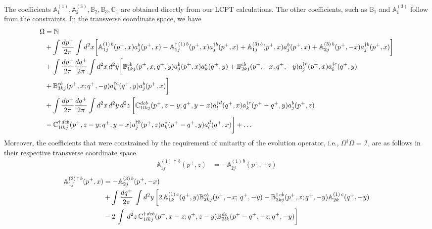 \documentclass[aps,prd,amsmath,amssymb,nofootinbib]{revtex4-2}
\def\mf#1{\mathbb{#1}}
\numberwithin{equation}{section}
\begin{document}
The coefficients $\mf{A}^{(1)}_{1}, \mf{A}^{(3)}_{2}, \mf{B}_{2}, \mf{B}_{3}, \mf{C}_{1}$ are obtained directly from our LCPT calculations. The other coefficients, such as $\mf{B}_{1}$ and $\mf{A}^{(3)}_{1}$ follow from the constraints. In the transverse coordinate space, we have
\begin{align}
    \Omega & = \mf{N} \notag \\ & +
                \int \frac{d p^+}{2\pi} 
             \int d^2 x  
                \bigg[\mf{A}^{(1)\, b}_{1j}(p^{+},x)a^{b}_{j}(p^{+},x) 
                -  \mf{A}^{\dagger\, (1)\, b}_{1j} (p^{+},x) a^{\dagger b}_{j}(p^{+},x)+ \mf{A}^{(3)\, b}_{1j}(p^{+},x)a^{b}_{j}(p^{+},x) 
                +  \mf{A}^{(3)\, b}_{2j} (p^{+},-x) a^{\dagger b}_{j}(p^{+},x)\bigg] \notag \\ & 
               +\int \frac{d p^+}{2\pi} \frac{d q^+}{2\pi} \int d^2x\, d^2y  
               \bigg[\mf{B}^{cb}_{1kj}(p^{+}, x;q^{+}, y) a^{b}_{j}(p^{+},x)a^{c}_{k}(q^{+},y) 
                   + \mf{B}^{cb}_{2kj}(p^{+},-x; q^{+},-y) a^{\dagger b}_{j}(p^{+},x)a^{\dagger c}_{k}(q^{+},y)
            \notag \\ & 
                  + \mf{B}^{cb}_{3kj} (p^{+},x; q^{+}, -y) a^{\dagger c}_{k}(q^{+},y)a^{b}_{j}(p^{+},x)\bigg] \notag \\ & 
               + \int 
               \frac{d p^+}{2\pi} \frac{dq^+}{2\pi} 
               \int d^2x\, d^2y\,  d^2 z\, 
               \bigg[\mf{C}^{ dcb}_{1lkj}(p^{+},z-y; q^{+},y-x) a^{\dagger d}_{l}(q^{+},x)  a^{\dagger c}_{k}(p^{+}-q^{+}, y)  a^{b}_{j}(p^{+},z)
               \notag \\ & 
               -  \mf{C}^{\dagger\, dcb}_{1lkj}(p^{+},z-y; q^{+}, y-x) a^{\dagger b}_{j}(p^{+},z) a^{c}_{k}(p^{+}-q^{+},y) a^{d}_{l}(q^{+},x)\bigg] + \ldots
\end{align}
Moreover, the coefficients that were constrained by the requirement of unitarity of the evolution operator, i.e., $\Omega^{\dagger}\Omega = \mathcal{I}$, are as follows in their respective transverse coordinate space. 
\begin{align}
    \mf{A}^{(1)\, \dagger\,  b}_{1j}(p^{+},z) & =  -\mf{A}^{(1)\, b}_{2j}(p^{+},-z)
\end{align}
\begin{align}
 \mf{A}^{(3)\, \dagger\, b}_{1j}(p^{+},x) & = -\mf{A}^{(3)\, b}_{2j}(p^{+}, -x)\notag \\ & +\int \frac{dq^{+}}{2\pi}\, \int d^{2}y\, \bigg[2\, \mf{A}^{(1)\, c}_{1k}(q^{+}, y)\mf{B}^{cb}_{2kj}(p^{+}, -x;\, q^{+},-y)-\mf{B}^{\dagger\, cb}_{3kj}(p^{+}, x; q^{+}, -y)\mf{A}^{(1)\,c}_{2k}(q^{+},-y)\notag \\ & -2\,\int\, d^{2}z\, \mf{C}^{\dagger\, dcb}_{1lkj}(p^{+},x-z; q^{+},z-y)\mf{B}^{dc}_{2lk}(p^{+}-q^{+},-z; q^{+},-y)\bigg]
\end{align}
\end{document}
